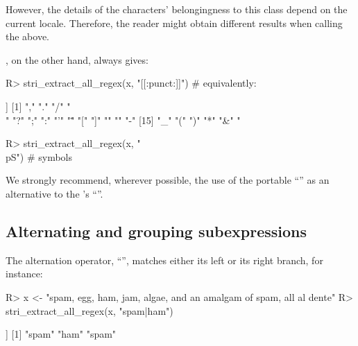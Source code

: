 \documentclass[nojss]{jss}
\begin{document}

However, the details of the characters' belongingness
to this class depend on the current locale.
Therefore, the reader might obtain different results when calling the above.

, on the other hand, always gives:

\begin{Schunk}
\begin{Sinput}
R> stri_extract_all_regex(x, "[[:punct:]]")    # equivalently: 
\end{Sinput}
\begin{Soutput}
[[1]]
 [1] ","  "."  "/"  "\\" "?"  ";"  ":"  "'"  "\"" "["  "]"  "{"  "}"  "-"
[15] "_"  "("  ")"  "*"  "&"  "%"  "#"  "@"  "!"  "‒"  "„"  "”"
\end{Soutput}
\begin{Sinput}
R> stri_extract_all_regex(x, "\\p{S}")         # symbols
\end{Sinput}
\end{Schunk}


We strongly recommend, wherever possible, the use of the portable
``''
as an alternative to the 's ``\code{[:punct:]}''.



\subsection{Alternating and grouping subexpressions}

The alternation operator, ``\code{|}'',
matches either its left or its right branch,
for instance:

\begin{Schunk}
\begin{Sinput}
R> x <- "spam, egg, ham, jam, algae, and an amalgam of spam, all al dente"
R> stri_extract_all_regex(x, "spam|ham")
\end{Sinput}
\begin{Soutput}
[[1]]
[1] "spam" "ham"  "spam"
\end{Soutput}
\end{Schunk}
\end{document}

